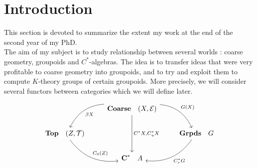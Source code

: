 \section{Introduction}

This section is devoted to summarize the extent my work at the end of the second year of my PhD.\\

The aim of my subject is to study relationship between several worlds : coarse geometry, groupoids and $C^*$-algebras. The idea is to transfer ideas that were very profitable to coarse geometry into groupoids, and to try and exploit them to compute $K$-theory groups of certain groupoids. More precisely, we will consider several functors between categories which we will define later.

\[\begin{tikzcd}
\  & \textbf{Coarse} \quad (X,\mathcal E) \arrow[bend left]{dr}{G(X)} \arrow[bend right]{dl}{\beta X} \arrow{dd}{C^*X,C^*_uX}& \ \\
 \textbf{Top} \quad (Z,\mathcal T) \arrow[bend right]{dr}{C_0(Z)} & \  & \textbf{Grpds}\quad G \arrow[bend left]{dl}{C^*_r G} \\
 \ & \textbf{C}^* \quad A& \ \\
\end{tikzcd}\] 
